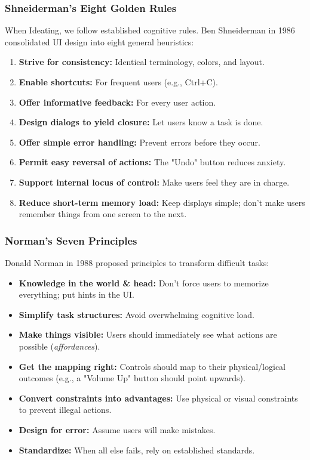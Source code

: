 \documentclass[xcolor=table]{beamer}
\begin{document}
\begin{frame}
    \frametitle{Shneiderman's Eight Golden Rules}
    When Ideating, we follow established cognitive rules. Ben Shneiderman in 1986 consolidated UI design into eight general heuristics:
    \small
    \begin{enumerate}
        \item \textbf{Strive for consistency:} Identical terminology, colors, and layout.
        \item \textbf{Enable shortcuts:} For frequent users (e.g., Ctrl+C).
        \item \textbf{Offer informative feedback:} For every user action.
        \item \textbf{Design dialogs to yield closure:} Let users know a task is done.
        \item \textbf{Offer simple error handling:} Prevent errors before they occur.
        \item \textbf{Permit easy reversal of actions:} The "Undo" button reduces anxiety.
        \item \textbf{Support internal locus of control:} Make users feel they are in charge.
        \item \textbf{Reduce short-term memory load:} Keep displays simple; don't make users remember things from one screen to the next.
    \end{enumerate}
\end{frame}

\begin{frame}
    \frametitle{Norman's Seven Principles}
    Donald Norman in 1988 proposed principles to transform difficult tasks:
    
    \begin{itemize}
        \item \textbf{Knowledge in the world \& head:} Don't force users to memorize everything; put hints in the UI.
        \item \textbf{Simplify task structures:} Avoid overwhelming cognitive load.
        \item \textbf{Make things visible:} Users should immediately see what actions are possible (\textit{affordances}).
        \item \textbf{Get the mapping right:} Controls should map to their physical/logical outcomes (e.g., a "Volume Up" button should point upwards).
        \item \textbf{Convert constraints into advantages:} Use physical or visual constraints to prevent illegal actions.
        \item \textbf{Design for error:} Assume users will make mistakes.
        \item \textbf{Standardize:} When all else fails, rely on established standards.
    \end{itemize}
\end{frame}
\end{document}
